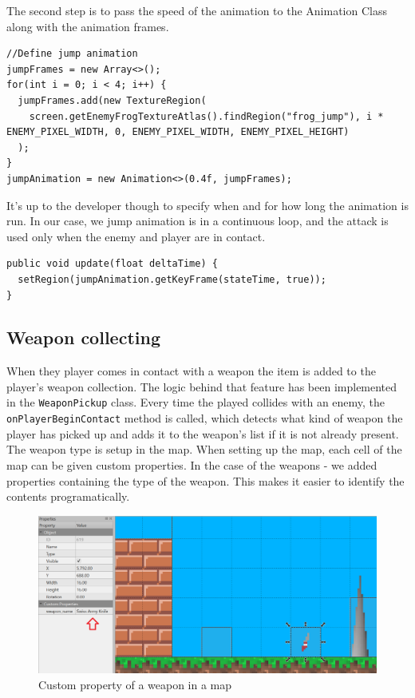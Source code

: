 \documentclass[12p]{article}
\begin{document}
The second step is to pass the speed of the animation to the Animation Class along with the animation frames.

\begin{verbatim}
//Define jump animation
jumpFrames = new Array<>();
for(int i = 0; i < 4; i++) {
  jumpFrames.add(new TextureRegion(
    screen.getEnemyFrogTextureAtlas().findRegion("frog_jump"), i * ENEMY_PIXEL_WIDTH, 0, ENEMY_PIXEL_WIDTH, ENEMY_PIXEL_HEIGHT)
  );
}
jumpAnimation = new Animation<>(0.4f, jumpFrames);
\end{verbatim}

It's up to the developer though to specify when and for how long the animation is run. In our case, we jump animation is in a continuous loop, and the attack is used only when the enemy and player are in contact.

\begin{verbatim}
public void update(float deltaTime) {
  setRegion(jumpAnimation.getKeyFrame(stateTime, true));
}
\end{verbatim}


\subsection{Weapon collecting} \label{DocWeaponCollection}

When they player comes in contact with a weapon the item is added to the player's weapon collection. The logic behind that feature has been implemented in the \texttt{WeaponPickup} class. Every time the played collides with an enemy, the \texttt{onPlayerBeginContact} method is called, which detects what kind of weapon the player has picked up and adds it to the weapon's list if it is not already present. The weapon type is setup in the map. When setting up the map, each cell of the map can be given custom properties. In the case of the weapons - we added properties containing the type of the weapon. This makes it easier to identify the contents programatically.

\begin{figure}[ht]
  \center
  \includegraphics[width=1\textwidth]{Documentation/weaponMaps.png}
  \caption{Custom property of a weapon in a map}
\end{figure}
\end{document}
